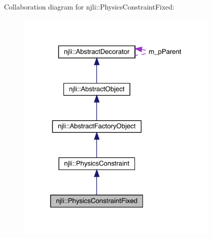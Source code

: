 Collaboration diagram for njli\+:\+:Physics\+Constraint\+Fixed\+:\nopagebreak
\begin{figure}[H]
\begin{center}
\leavevmode
\includegraphics[width=276pt]{classnjli_1_1_physics_constraint_fixed__coll__graph}
\end{center}
\end{figure}
